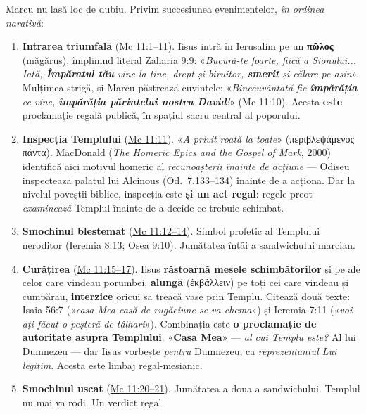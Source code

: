 \documentclass[12pt,a4paper,twoside,openany]{book}
\begin{document}
Marcu nu lasă loc de dubiu. Privim succesiunea evenimentelor, \textit{în ordinea narativă}:

\begin{enumerate}
  \item \textbf{Intrarea triumfală} (\href{https://bibliaortodoxa.ro/carte.php?id=53\&cap=11\#1}{Mc 11:1--11}). Iisus intră în Ierusalim pe un \textbf{πῶλος} (măgăruș), împlinind literal \href{https://bibliaortodoxa.ro/carte.php?id=37\&cap=9\#9}{Zaharia 9:9}: «\textit{Bucură-te foarte, fiică a Sionului... Iată, \textbf{Împăratul tău} vine la tine, drept și biruitor, \textbf{smerit} și călare pe asin}». Mulțimea strigă, și Marcu păstrează cuvintele: «\textit{Binecuvântată fie \textbf{împărăția} ce vine, \textbf{împărăția părintelui nostru David}!}» (Mc 11:10). Acesta \textbf{este} proclamație regală publică, în spațiul sacru central al poporului.
  \item \textbf{Inspecția Templului} (\href{https://bibliaortodoxa.ro/carte.php?id=53\&cap=11\#11}{Mc 11:11}). «\textit{A privit roată la toate}» (περιβλεψάμενος πάντα). MacDonald (\textit{The Homeric Epics and the Gospel of Mark}, 2000) identifică aici motivul homeric al \textit{recunoașterii înainte de acțiune} — Odiseu inspectează palatul lui Alcinous (Od.\ 7.133--134) înainte de a acționa. Dar la nivelul poveștii biblice, inspecția este \textbf{și un act regal}: regele-preot \textit{examinează} Templul înainte de a decide ce trebuie schimbat.
  \item \textbf{Smochinul blestemat} (\href{https://bibliaortodoxa.ro/carte.php?id=53\&cap=11\#12}{Mc 11:12--14}). Simbol profetic al Templului neroditor (Ieremia 8:13; Osea 9:10). Jumătatea întâi a sandwichului marcian.
  \item \textbf{Curățirea} (\href{https://bibliaortodoxa.ro/carte.php?id=53\&cap=11\#15}{Mc 11:15--17}). Iisus \textbf{răstoarnă mesele schimbătorilor} și pe ale celor care vindeau porumbei, \textbf{alungă} (ἐκβάλλειν) pe toți cei care vindeau și cumpărau, \textbf{interzice} oricui să treacă vase prin Templu. Citează două texte: Isaia 56:7 («\textit{casa Mea casă de rugăciune se va chema}») și Ieremia 7:11 («\textit{voi ați făcut-o peșteră de tâlhari}»). Combinația este \textbf{o proclamație de autoritate asupra Templului}. «\textbf{Casa Mea}» — \textit{al cui Templu este?} Al lui Dumnezeu — dar Iisus vorbește \textit{pentru} Dumnezeu, ca \textit{reprezentantul Lui legitim}. Acesta este limbaj regal-mesianic.
  \item \textbf{Smochinul uscat} (\href{https://bibliaortodoxa.ro/carte.php?id=53\&cap=11\#20}{Mc 11:20--21}). Jumătatea a doua a sandwichului. Templul nu mai va rodi. Un verdict regal.

\end{enumerate}
\end{document}
